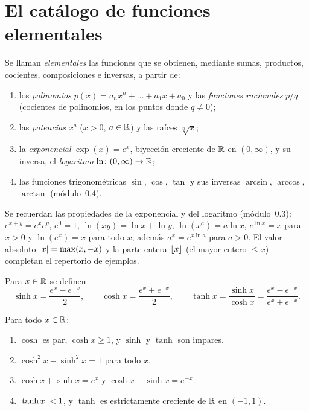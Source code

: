 \section{El catálogo de funciones elementales}

\begin{definicion}\label{def:elementales}
Se llaman \emph{elementales} las funciones que se obtienen, mediante sumas, productos, cocientes, composiciones e inversas, a partir de:
\begin{enumerate}
  \item los \emph{polinomios} $p(x)=a_nx^{n}+\dots+a_1x+a_0$ y las \emph{funciones racionales} $p/q$ (cocientes de polinomios, en los puntos donde $q\ne0$);
  \item las \emph{potencias} $x^{a}$ ($x>0$, $a\in\mathbb{R}$) y las raíces $\sqrt[n]{x}$;
  \item la \emph{exponencial} $\exp(x)=e^{x}$, biyección creciente de $\mathbb{R}$ en $(0,\infty)$, y su inversa, el \emph{logaritmo} $\ln\colon(0,\infty)\to\mathbb{R}$;
  \item las funciones trigonométricas $\sin$, $\cos$, $\tan$ y sus inversas $\arcsin$, $\arccos$, $\arctan$ (módulo~0.4).
\end{enumerate}
\end{definicion}

Se recuerdan las propiedades de la exponencial y del logaritmo (módulo~0.3): $e^{x+y}=e^{x}e^{y}$, $e^{0}=1$, $\ln(xy)=\ln x+\ln y$, $\ln(x^{a})=a\ln x$, $e^{\ln x}=x$ para $x>0$ y $\ln(e^{x})=x$ para todo $x$; además $a^{x}=e^{x\ln a}$ para $a>0$. El valor absoluto $\lvert x\rvert=\max(x,-x)$ y la parte entera $\lfloor x\rfloor$ (el mayor entero $\le x$) completan el repertorio de ejemplos.

\begin{definicion}\label{def:hiperbolicas}
Para $x\in\mathbb{R}$ se definen
\[
\sinh x=\frac{e^{x}-e^{-x}}{2},\qquad \cosh x=\frac{e^{x}+e^{-x}}{2},\qquad \tanh x=\frac{\sinh x}{\cosh x}=\frac{e^{x}-e^{-x}}{e^{x}+e^{-x}}.
\]
\end{definicion}

\begin{proposicion}\label{prop:hiperbolicas}
Para todo $x\in\mathbb{R}$:
\begin{enumerate}
  \item $\cosh$ es par, $\cosh x\ge1$, y $\sinh$ y $\tanh$ son impares.
  \item $\cosh^{2}x-\sinh^{2}x=1$ para todo $x$.
  \item $\cosh x+\sinh x=e^{x}$ y $\cosh x-\sinh x=e^{-x}$.
  \item $\lvert\tanh x\rvert<1$, y $\tanh$ es estrictamente creciente de $\mathbb{R}$ en $(-1,1)$.
\end{enumerate}
\end{proposicion}

